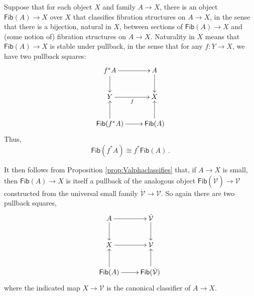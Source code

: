 \documentclass[11pt]{article}
\newcommand{\ra}{\ensuremath{\rightarrow}}
\renewcommand{\to}{\ensuremath{\rightarrow}}
\newcommand{\V}{\ensuremath{\mathcal{V}}}
\newcommand{\VV}{\ensuremath{\dot{\mathcal{V}}}}
\newcommand{\Fib}{\ensuremath{\mathsf{Fib}}}
\theoremstyle{remark}
\theoremstyle{definition}
\begin{document}
Suppose that for each object $X$ and family $A\to X$, there is an object $\Fib(A) \ra X$ over $X$ that classifies fibration structures on $A\to X$, in the sense that there is a bijection, natural in $X$, between sections of $\Fib(A) \ra X$ and (some notion of) fibration structures on $A\to X$.
Naturality in $X$ means that $\Fib(A) \ra X$ is stable under pullback, in the sense that for any $f:Y\ra X$, we have two pullback squares:
\begin{equation}\label{diagram:fibstable}
\xymatrix{
f^*A \ar[d] \ar[r]  & A \ar[d]\\
Y \ar[r]_{f} &X\\
\Fib(f^*A) \ar[u] \ar[r] & \Fib(A) \ar[u].
}
\end{equation}
Thus,
\[
\Fib(f^*A) \cong f^* \Fib(A)\,.
\]

It then follows from Proposition \ref{prop:Valphaclassifies} that, if $A\ra X$ is small, then $\Fib(A) \ra X$ is itself a pullback of the analogous object $\Fib(\VV) \ra \V$ constructed from the universal small family $\VV\ra\V$. So again there are two pullback squares,
\begin{equation}\label{diagram:tfib1}
\xymatrix{
A \ar[d] \ar[r]  & \VV \ar[d]\\
X \ar[r] & \V\\
\Fib(A)\ar[u] \ar[r] & \Fib(\VV)\ar[u]\,
}
\end{equation}
where the indicated map $X \to \V$ is the canonical classifier of $A\to X$.
\end{document}
